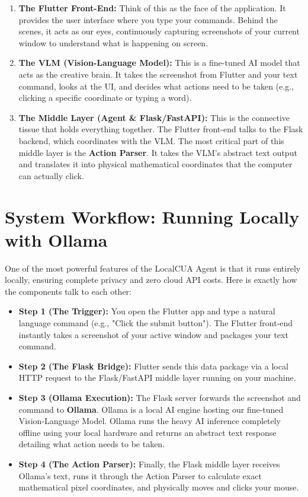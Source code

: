 \documentclass[a4paper,12pt]{article}
\begin{document}
\begin{enumerate}
    \item \textbf{The Flutter Front-End:} Think of this as the face of the application. It provides the user interface where you type your commands. Behind the scenes, it acts as our eyes, continuously capturing screenshots of your current window to understand what is happening on screen.
    \item \textbf{The VLM (Vision-Language Model):} This is a fine-tuned AI model that acts as the creative brain. It takes the screenshot from Flutter and your text command, looks at the UI, and decides what actions need to be taken (e.g., clicking a specific coordinate or typing a word).
    \item \textbf{The Middle Layer (Agent \& Flask/FastAPI):} This is the connective tissue that holds everything together. The Flutter front-end talks to the Flask backend, which coordinates with the VLM. The most critical part of this middle layer is the \textbf{Action Parser}. It takes the VLM's abstract text output and translates it into physical mathematical coordinates that the computer can actually click.
\end{enumerate}

\section{System Workflow: Running Locally with Ollama}
One of the most powerful features of the LocalCUA Agent is that it runs entirely locally, ensuring complete privacy and zero cloud API costs. Here is exactly how the components talk to each other:
\begin{itemize}
    \item \textbf{Step 1 (The Trigger):} You open the Flutter app and type a natural language command (e.g., "Click the submit button"). The Flutter front-end instantly takes a screenshot of your active window and packages your text command.
    \item \textbf{Step 2 (The Flask Bridge):} Flutter sends this data package via a local HTTP request to the Flask/FastAPI middle layer running on your machine.
    \item \textbf{Step 3 (Ollama Execution):} The Flask server forwards the screenshot and command to \textbf{Ollama}. Ollama is a local AI engine hosting our fine-tuned Vision-Language Model. Ollama runs the heavy AI inference completely offline using your local hardware and returns an abstract text response detailing what action needs to be taken.
    \item \textbf{Step 4 (The Action Parser):} Finally, the Flask middle layer receives Ollama's text, runs it through the Action Parser to calculate exact mathematical pixel coordinates, and physically moves and clicks your mouse.
\end{itemize}
\end{document}
